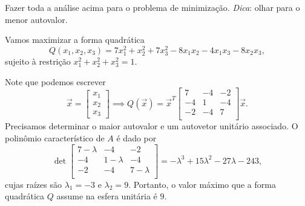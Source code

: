 \documentclass[../livro.tex]{subfiles}
\begin{document}
\begin{exercise}
	Fazer toda a análise acima para o problema de minimização. \textit{Dica}: olhar para o menor autovalor.
\end{exercise}


\begin{example}\label{otimiz}
	Vamos maximizar a forma quadrática 
	\begin{equation}
	Q(x_1, x_2, x_3) = 7 x_1^2 + x_2^2 + 7x_3^2 - 8 x_1x_2 - 4x_1x_3 - 8 x_2x_3,
	\end{equation} sujeito à restrição $x_1^2 + x_2^2 + x_3^2 = 1$.
	
	Note que podemos escrever
	\begin{equation}
	\vec{x} = 
	\begin{bmatrix}
	x_1 \\ x_2 \\ x_3
	\end{bmatrix} \implies 
	Q(\vec{x}) = \vec{x}^T 
	\begin{bmatrix}
	7 & -4 & -2 \\
	-4 &  1 & -4 \\
	-2 & -4 &  7 \\
	\end{bmatrix}\vec{x}.
	\end{equation} Precisamos determinar o maior autovalor e um autovetor unitário associado. O polinômio característico de $A$ é dado por 
	\begin{equation}
	\det 
	\begin{bmatrix}
	7 - \lambda & -4 & -2 \\
	-4 &  1 - \lambda & -4 \\
	-2 & -4 &  7 - \lambda \\
	\end{bmatrix} = - \lambda^3 + 15 \lambda^2 - 27 \lambda - 243,
	\end{equation} cujas raízes são $\lambda_1 = -3$ e $\lambda_2 = 9$. Portanto, o valor máximo que a forma quadrática $Q$ assume na esfera unitária é $9$.
	

\end{example}
\end{document}
